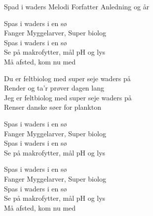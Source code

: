 \begin{song}{Spad i waders}
  {} %
  {Melodi} %
  {Forfatter} %
  {Anledning og år} %
  {\NotCCLIed} %

  \begin{SBChorus}
Spas i waders i en sø\\
Fanger Myggelarver, Super biolog\\
Spas i waders i en sø\\
Se på makrofytter, mål pH og lys\\
Må afsted, kom nu med
  \end{SBChorus}

  \begin{SBVerse}
Du er feltbiolog med super seje waders på\\
Render og ta'r prøver dagen lang\\
Jeg er feltbiolog med super seje waders på\\
Renser danske søer for plankton
  \end{SBVerse}

  \begin{SBChorus}
Spas i waders i en sø\\
Fanger Myggelarver, Super biolog\\
Spas i waders i en sø\\
Se på makrofytter, mål pH og lys
  \end{SBChorus}

  \begin{SBChorus}
Spas i waders i en sø\\
Fanger Myggelarver, Super biolog\\
Spas i waders i en sø\\
Se på makrofytter, mål pH og lys\\
Må afsted, kom nu med
  \end{SBChorus}




\end{song}
